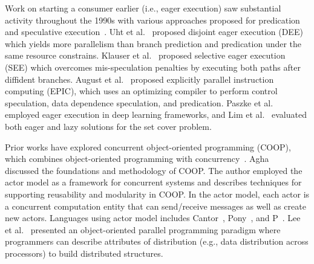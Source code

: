 
 Work on starting a consumer earlier (i.e., eager execution) saw substantial activity throughout the 1990s with various approaches proposed for predication and speculative execution~\cite{Yeh92,Pan92,Jimenez02,Chrysos98,Moshovos99,Subramaniam06}. Uht et al.~\cite{Uht95} proposed disjoint eager execution (DEE) which yields more parallelism than branch prediction and predication under the same resource constrains. Klauser et al.~\cite{Klauser98} proposed selective eager execution (SEE) which overcomes mis-speculation penalties by executing both paths after diffident branches.
August et al.~\cite{August:1998:IPS:279358.279391} proposed explicitly parallel instruction computing (EPIC), which uses an optimizing compiler to perform control speculation, data dependence speculation, and predication. Paszke et al.~\cite{paszke2017automatic} employed eager execution in deep learning frameworks, and Lim et al.~\cite{Lim:2014:LEA:2667473.2667476} evaluated both eager and lazy solutions for the set cover problem. 

 Prior works have explored concurrent object-oriented programming (COOP), which combines object-oriented programming with concurrency~\cite{DBLP:journals/corr/GanesanJMMAW16,Charousset:2013:NAS:2541329.2541336,Charousset:2016:RAP:2956216.2956327}. Agha~\cite{Agha:1990:COP:83880.84528} discussed the foundations and methodology of COOP. The author employed the actor model as a framework for concurrent systems and describes techniques for supporting reusability and modularity in COOP. In the actor model, each actor is a concurrent computation entity that can send/receive messages as well as create new actors. Languages using actor model includes Cantor~\cite{Athas:1988:CAP:67386.67402},  Pony~\cite{Clebsch:2015:DCS:2824815.2824816}, and P~\cite{Desai:2013:PSA:2491956.2462184}.  Lee et al.~\cite{Lee:1991:OOP:125826.105186} presented an object-oriented parallel programming paradigm where programmers can describe attributes of distribution (e.g., data distribution across processors) to build distributed structures.

